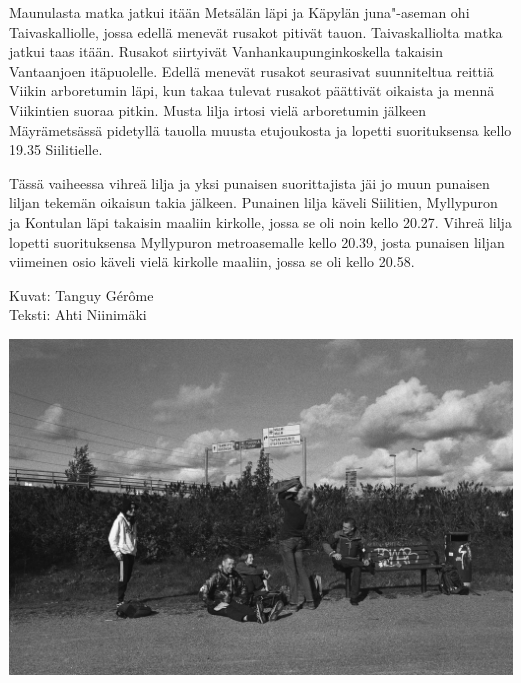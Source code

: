 \begin{multicols}{2}
Maunulasta matka jatkui itään Metsälän läpi ja Käpylän juna"-aseman ohi 
Taivaskalliolle, jossa edellä menevät rusakot pitivät tauon. Taivaskalliolta 
matka jatkui taas itään. Rusakot siirtyivät Vanhankaupunginkoskella takaisin 
Vantaanjoen itäpuolelle. Edellä menevät rusakot seurasivat suunniteltua 
reittiä Viikin arboretumin läpi, kun takaa tulevat rusakot päättivät 
oikaista ja mennä Viikintien suoraa pitkin. Musta lilja irtosi vielä 
arboretumin jälkeen Mäyrämetsässä pidetyllä tauolla muusta etujoukosta ja 
lopetti suorituksensa kello 19.35 Siilitielle.

Tässä vaiheessa vihreä lilja ja yksi punaisen suorittajista jäi jo muun 
punaisen liljan tekemän oikaisun takia jälkeen. Punainen lilja käveli 
Siilitien, Myllypuron ja Kontulan läpi takaisin maaliin kirkolle, jossa se oli 
noin kello 20.27. Vihreä lilja lopetti suorituksensa Myllypuron metroasemalle 
kello 20.39, josta punaisen liljan viimeinen osio käveli vielä kirkolle 
maaliin, jossa se oli kello 20.58.

\end{multicols}

{\raggedleft Kuvat: Tanguy Gérôme\\Teksti: Ahti Niinimäki\par}

\vspace*{0.64cm}
\noindent\includegraphics[width=\linewidth]{assets/nahkaliljapunainen4.jpg}

